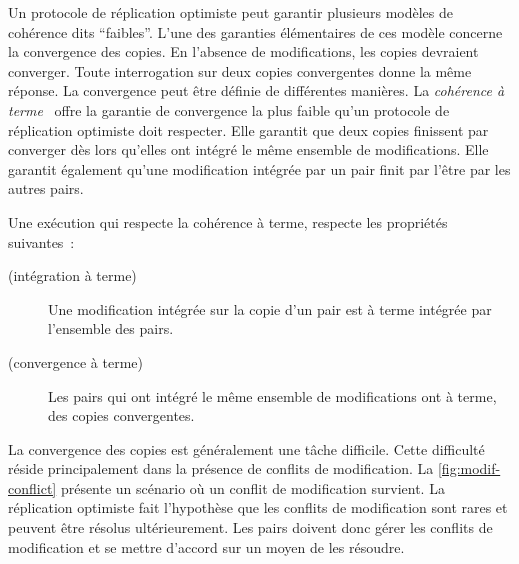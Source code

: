 Un protocole de réplication optimiste peut garantir plusieurs modèles de cohérence dits \enquote{faibles}.
L'une des garanties élémentaires de ces modèle concerne la convergence des copies.
En l'absence de modifications, les copies devraient converger.
Toute interrogation sur deux copies convergentes donne la même réponse.
La convergence peut être définie de différentes manières.
La \emph{cohérence à terme}~\autocite{terry_sessionguarentees_1994,saito_2005_optimisticreplication, vogels_eventuallyconsistent_2009} offre la garantie de convergence la plus faible qu'un protocole de réplication optimiste doit respecter.
Elle garantit que deux copies finissent par converger dès lors qu'elles ont intégré le même ensemble de modifications.
Elle garantit également qu'une modification intégrée par un pair finit par l'être par les autres pairs.

\begin{definition}\label{def:eventual-consistency}
  Une exécution qui respecte la cohérence à terme, respecte les propriétés suivantes~:
  \begin{description}
  \item[ (intégration à terme)] Une modification intégrée sur la copie d'un pair est à terme intégrée par l'ensemble des pairs.
  \item[ (convergence à terme)] Les pairs qui ont intégré le même ensemble de modifications ont à terme, des copies convergentes.
  \end{description}
\end{definition}

\clearpage

La convergence des copies est généralement une tâche difficile.
Cette difficulté réside principalement dans la présence de conflits de modification.
La \autoref{fig:modif-conflict} présente un scénario où un conflit de modification survient.
La réplication optimiste fait l'hypothèse  que les conflits de modification sont rares et peuvent être résolus ultérieurement.
Les pairs doivent donc gérer les conflits de modification et se mettre d'accord sur un moyen de les résoudre.

